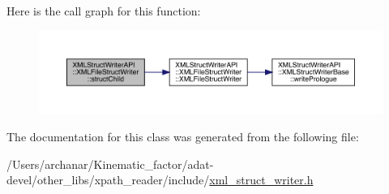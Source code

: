 Here is the call graph for this function\+:
\nopagebreak
\begin{figure}[H]
\begin{center}
\leavevmode
\includegraphics[width=350pt]{db/de3/classXMLStructWriterAPI_1_1XMLFileStructWriter_a29ff0f4353991294bab0c75ab8895f73_cgraph}
\end{center}
\end{figure}


The documentation for this class was generated from the following file\+:\begin{DoxyCompactItemize}
\item 
/\+Users/archanar/\+Kinematic\+\_\+factor/adat-\/devel/other\+\_\+libs/xpath\+\_\+reader/include/\mbox{\hyperlink{adat-devel_2other__libs_2xpath__reader_2include_2xml__struct__writer_8h}{xml\+\_\+struct\+\_\+writer.\+h}}\end{DoxyCompactItemize}
